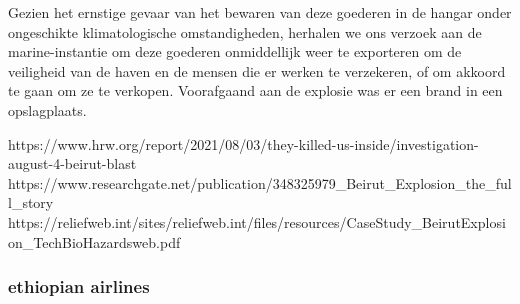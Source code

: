 Gezien het ernstige gevaar van het bewaren van deze goederen in de hangar onder ongeschikte klimatologische omstandigheden, herhalen we ons verzoek aan de marine-instantie om deze goederen onmiddellijk weer te exporteren om de veiligheid van de haven en de mensen die er werken te verzekeren, of om akkoord te gaan om ze te verkopen.
Voorafgaand aan de explosie was er een brand in een opslagplaats. 

https://www.hrw.org/report/2021/08/03/they-killed-us-inside/investigation-august-4-beirut-blast 
https://www.researchgate.net/publication/348325979_Beirut_Explosion_the_full_story 
https://reliefweb.int/sites/reliefweb.int/files/resources/CaseStudy_BeirutExplosion_TechBioHazardsweb.pdf 


\subsubsection{ethiopian airlines}

